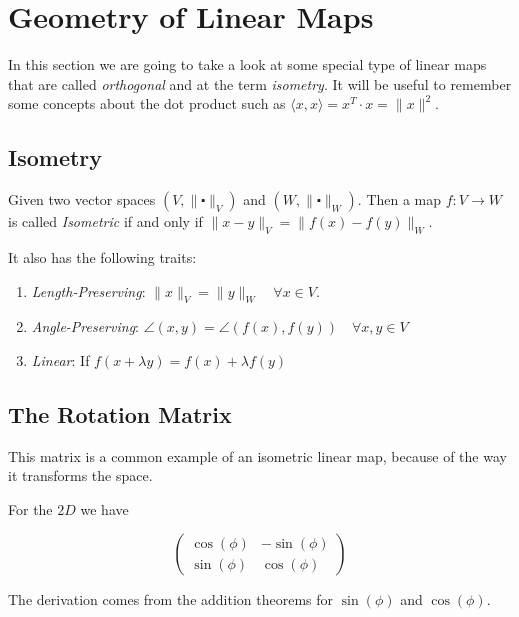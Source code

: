 \newpage
\section{Geometry of Linear Maps}

In this section we are going to take a look at some special type of linear maps that are called \emph{orthogonal} 
and at the term \emph{isometry}. It will be useful to remember some concepts about the dot product such as 
\(\langle x, x \rangle = x^T \cdot x = \|x\|^2\).

\subsection{Isometry}

Given two vector spaces \((V, \|\centerdot\|_V)\) and \((W, \|\centerdot\|_W)\). Then a map 
\(f: V \to W\) is called \emph{Isometric} if and only if \(\|x - y\|_V = \|f(x) - f(y)\|_W \).
\vspace{\baselineskip} 

It also has the following traits:

\begin{enumerate}
	\item \emph{Length-Preserving}: \(\|x\|_V = \|y\|_W \quad \forall x \in V\).
	\item \emph{Angle-Preserving}: \(\angle (x,y) = \angle (f(x),f(y)) \quad \forall x,y \in V\)
	\item \emph{Linear}: If \(f(x + \lambda y) = f(x) + \lambda f(y)\)
\end{enumerate}

\subsection{The Rotation Matrix}

This matrix is a common example of an isometric linear map, because of the way it transforms the space.
\vspace{\baselineskip}

For the \(2D\) we have 

\[
    \begin{pmatrix}
        \cos(\phi) & -\sin(\phi)\\
        \sin(\phi) & \cos(\phi)
    \end{pmatrix}
\]

The derivation comes from the addition theorems for \(\sin(\phi) \) and \(\cos(\phi)\).
\vspace{\baselineskip}

